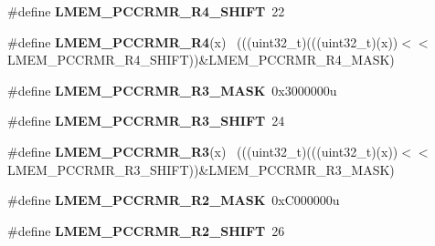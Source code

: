 \begin{DoxyCompactItemize}
\item 
\hypertarget{group___l_m_e_m___register___masks_gac1a52472a53b997506c61537842dec9c}{}\#define {\bfseries L\+M\+E\+M\+\_\+\+P\+C\+C\+R\+M\+R\+\_\+\+R4\+\_\+\+S\+H\+I\+F\+T}~22\label{group___l_m_e_m___register___masks_gac1a52472a53b997506c61537842dec9c}

\item 
\hypertarget{group___l_m_e_m___register___masks_gafdc645c701bb817e2fbb15196fb501ab}{}\#define {\bfseries L\+M\+E\+M\+\_\+\+P\+C\+C\+R\+M\+R\+\_\+\+R4}(x)                                            ~(((uint32\+\_\+t)(((uint32\+\_\+t)(x))$<$$<$L\+M\+E\+M\+\_\+\+P\+C\+C\+R\+M\+R\+\_\+\+R4\+\_\+\+S\+H\+I\+F\+T))\&L\+M\+E\+M\+\_\+\+P\+C\+C\+R\+M\+R\+\_\+\+R4\+\_\+\+M\+A\+S\+K)\label{group___l_m_e_m___register___masks_gafdc645c701bb817e2fbb15196fb501ab}

\item 
\hypertarget{group___l_m_e_m___register___masks_ga8cca9529a6df1d2dc9b19efe0084da54}{}\#define {\bfseries L\+M\+E\+M\+\_\+\+P\+C\+C\+R\+M\+R\+\_\+\+R3\+\_\+\+M\+A\+S\+K}~0x3000000u\label{group___l_m_e_m___register___masks_ga8cca9529a6df1d2dc9b19efe0084da54}

\item 
\hypertarget{group___l_m_e_m___register___masks_ga989b2cb0e5ca04effcfdc8ba67103962}{}\#define {\bfseries L\+M\+E\+M\+\_\+\+P\+C\+C\+R\+M\+R\+\_\+\+R3\+\_\+\+S\+H\+I\+F\+T}~24\label{group___l_m_e_m___register___masks_ga989b2cb0e5ca04effcfdc8ba67103962}

\item 
\hypertarget{group___l_m_e_m___register___masks_ga89ee3df74b985a1ab89325ead4469851}{}\#define {\bfseries L\+M\+E\+M\+\_\+\+P\+C\+C\+R\+M\+R\+\_\+\+R3}(x)                                            ~(((uint32\+\_\+t)(((uint32\+\_\+t)(x))$<$$<$L\+M\+E\+M\+\_\+\+P\+C\+C\+R\+M\+R\+\_\+\+R3\+\_\+\+S\+H\+I\+F\+T))\&L\+M\+E\+M\+\_\+\+P\+C\+C\+R\+M\+R\+\_\+\+R3\+\_\+\+M\+A\+S\+K)\label{group___l_m_e_m___register___masks_ga89ee3df74b985a1ab89325ead4469851}

\item 
\hypertarget{group___l_m_e_m___register___masks_ga669cba8bd7da963820b3d39d249e4f7f}{}\#define {\bfseries L\+M\+E\+M\+\_\+\+P\+C\+C\+R\+M\+R\+\_\+\+R2\+\_\+\+M\+A\+S\+K}~0x\+C000000u\label{group___l_m_e_m___register___masks_ga669cba8bd7da963820b3d39d249e4f7f}

\item 
\hypertarget{group___l_m_e_m___register___masks_gab38ff18c56471c0a55833665a8bf03d5}{}\#define {\bfseries L\+M\+E\+M\+\_\+\+P\+C\+C\+R\+M\+R\+\_\+\+R2\+\_\+\+S\+H\+I\+F\+T}~26\label{group___l_m_e_m___register___masks_gab38ff18c56471c0a55833665a8bf03d5}


\end{DoxyCompactItemize}
